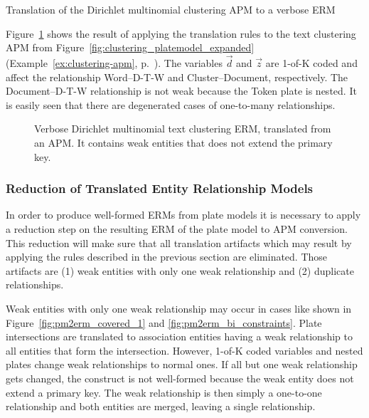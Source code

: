 \begin{Example} Translation of the Dirichlet multinomial clustering APM to a verbose ERM
\label{ex:clustering-erm-verbose}

Figure~\ref{fig:clustering_erm_good_verbose} shows the result of applying the translation rules to the text clustering APM from Figure~\ref{fig:clustering_platemodel_expanded} (Example~\ref{ex:clustering-apm}, p.~\pageref{ex:clustering-apm}). The variables $\vec d$ and $\vec z$ are 1-of-K coded and affect the relationship Word--D-T-W and Cluster--Document, respectively. The Document--D-T-W relationship is not weak because the Token plate is nested. It is easily seen that there are degenerated cases of one-to-many relationships.

\end{Example}

\begin{figure}[h]
\centering
\scalebox{\tikzScale}{\adjustTikzSize }
\caption[Verbose Dirichlet multinomial text clustering ERM]{Verbose Dirichlet multinomial text clustering ERM, translated from an APM. It contains weak entities that does not extend the primary key.}\label{fig:clustering_erm_good_verbose}
\end{figure}

\subsubsection{Reduction of Translated Entity Relationship Models}
\label{sec:erm_reduction}

In order to produce well-formed ERMs from plate models it is necessary to apply a reduction step on the resulting ERM of the plate model to APM conversion. This reduction will make sure that all translation artifacts which may result by applying the rules described in the previous section are eliminated. Those artifacts are (1) weak entities with only one weak relationship and (2) duplicate relationships.

Weak entities with only one weak relationship may occur in cases like shown in Figure~\ref{fig:pm2erm_covered_1} and \ref{fig:pm2erm_bi_constraints}. Plate intersections are translated to association entities having a weak relationship to all entities that form the intersection. However, 1-of-K coded variables and nested plates change weak relationships to normal ones. If all but one weak relationship gets changed, the construct is not well-formed because the weak entity does not extend a primary key. The weak relationship is then simply a one-to-one relationship and both entities are merged, leaving a single relationship.

